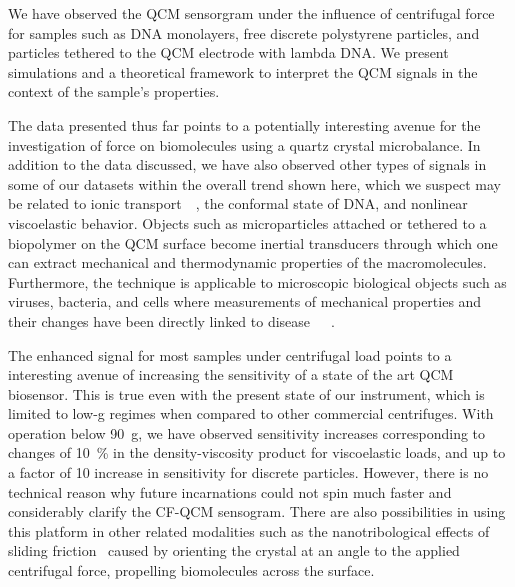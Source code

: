 We have observed the QCM sensorgram under the influence of centrifugal force
for samples such as DNA monolayers, free discrete polystyrene particles,
and particles tethered to the QCM electrode with lambda DNA.  We present
simulations and a theoretical framework to interpret the QCM signals in the
context of the sample's properties.

The data presented thus far points to a potentially interesting avenue for
the investigation of force on biomolecules using a quartz crystal
microbalance.  In addition to the data discussed, we have also observed
other types of signals in some of our datasets within the overall trend
shown here, which we suspect may be related to ionic
transport~\cite{tolman1911electromotive}~\cite{des1893unpolarisirbare}, the
conformal state of DNA, and nonlinear viscoelastic behavior.  Objects such
as microparticles attached or tethered to a biopolymer on the QCM surface
become inertial transducers through which one can extract mechanical and
thermodynamic properties of the macromolecules. Furthermore, the technique
is applicable to microscopic biological objects such as viruses, bacteria,
and cells where measurements of mechanical properties and their changes
have been directly linked to
disease~\cite{merkel1989molecular}~\cite{yeri2009mutation}~\cite{tevet2011friction}.

The enhanced signal for most samples under centrifugal load points to a
interesting avenue of increasing the sensitivity of a state of the art QCM
biosensor.  This is true even with the present state of our instrument,
which is limited to low-g regimes when compared to other commercial
centrifuges. With operation below \SI{90}{g}, we have observed sensitivity
increases corresponding to changes of \SI{10}{\percent} in the
density-viscosity product for viscoelastic loads, and up to a factor of 10
increase in sensitivity for discrete particles.  However, there is no
technical reason why future incarnations could not spin much faster and
considerably clarify the CF-QCM sensogram.  There are also possibilities in
using this platform in other related modalities such as the
nanotribological effects of sliding friction~\cite{krim1991nanotribology}
caused by orienting the crystal at an angle to the applied centrifugal
force, propelling biomolecules across the surface.

